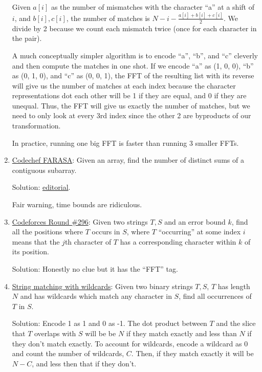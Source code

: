 \documentclass[11pt, oneside]{article}
\theoremstyle{plain}
\theoremstyle{definition}
\begin{document}
\begin{enumerate}
    Given \( a[i] \) as the number of mismatches with the character \enquote{a}
    at a shift of \( i \), and \( b[i], c[i] \), the number of matches is 
    \( N - i - \frac{a[i] + b[i] + c[i]}{2} \). We divide by 2 because we
    count each mismatch twice (once for each character in the pair).

    A much conceptually simpler algorithm is to encode \enquote{a}, \enquote{b},
    and \enquote{c} cleverly and then compute the matches in one shot. 
    If we encode \enquote{a} as (1, 0, 0), \enquote{b} as (0, 1, 0), and
    \enquote{c} as (0, 0, 1), the FFT of the resulting list with its reverse
    will give us the number of matches at each index because the character
    representations dot each other will be 1 if they are equal, and 0 
    if they are unequal. Thus, the FFT will give us exactly the number of
    matches, but we need to only look at every 3rd index since the other 2
    are byproducts of our transformation.

    In practice, running one big FFT is faster than running 3 smaller FFTs.

  \item \href{https://www.codechef.com/problems/FARASA}{Codechef FARASA}:
    Given an array, find the number of distinct sums of a contiguous subarray.

    Solution: \href{https://discuss.codechef.com/t/farasa-editorial/2688}
    {editorial}.

    Fair warning, time bounds are ridiculous.

  \item \href{https://codeforces.com/contest/528/problem/D}
    {Codeforces Round \#296}: Given two strings \( T, S \) and 
    an error bound \( k \), find all the positions where \( T \) occurs
    in \( S \), where \( T \) \enquote{occurring} at some index \( i \) 
    means that the \( j \)th character of \( T \) has a corresponding character
    within \( k \) of its position.

    Solution: Honestly no clue but it has the \enquote{FFT} tag.

  \item \href{https://cs.stanford.edu/~rishig/courses/ref/l17.txt}
    {String matching with wildcards}: Given two binary strings \( T, S \),
    \( T \) has length \( N \) and has wildcards which match any character
    in \( S \), find all occurrences of \( T \) in \( S \).

    Solution: Encode 1 as 1 and 0 as -1. The dot product between \( T \)
    and the slice that \( T \) overlaps with \( S \) will be be \( N \)
    if they match exactly and less than \( N \) if they don't match exactly.
    To account for wildcards, encode a wildcard as \( 0 \) and count the
    number of wildcards, \( C \). Then, if they match exactly it will be
    \( N - C \), and less then that if they don't.


\end{enumerate}
\end{document}
